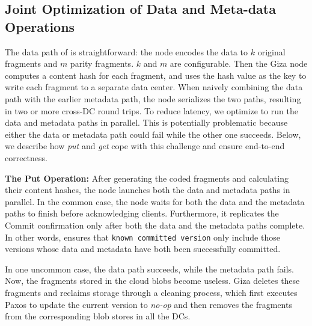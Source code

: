 \subsection{Joint Optimization of Data and Meta-data Operations}

The data path of \name is straightforward: the \name node encodes the data to $k$ original
fragments and $m$ parity fragments. $k$ and $m$ are configurable. Then the Giza node
computes a content hash for each fragment, and uses the hash value as the key to
write each fragment to a separate data center.
When naively combining the data path with the earlier metadata path,
the \name node serializes the two paths, resulting in two or more cross-DC round trips.
To reduce latency, we optimize \name to run the data and metadata paths in parallel.
This is potentially problematic because either the data or metadata path could fail
while the other one succeeds.
Below, we describe how {\em put} and {\em get} cope with this challenge and ensure end-to-end correctness.


{\bf The Put Operation:}
After generating the coded fragments and calculating their content hashes,
the \name node launches both the data and metadata paths in parallel.
In the common case,
the \name node waits for both the data and the metadata paths to finish before acknowledging clients.
Furthermore, it replicates the Commit confirmation only after both the data and the metadata paths complete. 
In other words, \name ensures that {\tt known committed version} only include those versions
whose data and metadata have both been successfully committed.

In one uncommon case, the data path succeeds, while the metadata path fails.
Now, the fragments stored in the cloud blobs become useless.
Giza deletes these fragments and reclaims storage through a cleaning process,
which first executes Paxos to update the current version to {\em no-op}
and then removes the fragments from the corresponding blob stores in all the DCs.

